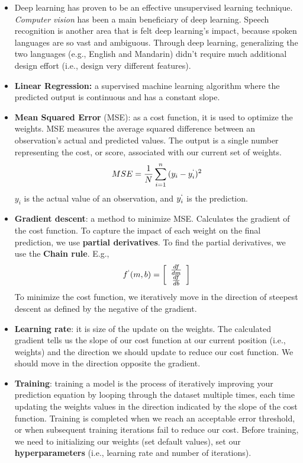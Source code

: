 \documentclass[]{article}
\begin{document}
\begin{itemize}
\begin{itemize}
		\item Deep learning has proven to be an effective unsupervised learning technique. \textit{Computer vision} has been a main beneficiary of deep learning. Speech recognition is another area that is felt deep learning's impact, because spoken languages are so vast and ambiguous. Through deep learning, generalizing the two languages (e.g., English and Mandarin) didn't require much additional design effort (i.e., design very different features).
		\item \textbf{Linear Regression:} a supervised machine learning algorithm where the predicted output is continuous and has a constant slope.
		\item \textbf{Mean Squared Error} (MSE): as a cost function, it is used to optimize the weights. MSE measures the average squared difference between an observation's actual and predicted values. The output is a single number representing the cost, or score, associated with our current set of weights.
		\begin{equation}
		MSE = \frac{1}{N} \sum_{i=1}^{n}{(y_i-y^`_i)^2}
		\end{equation}
		$y_i$ is the actual value of an observation, and $y^`_i$ is the prediction.
		\item \textbf{Gradient descent}: a method to minimize MSE. Calculates the gradient of the cost function. To capture the impact of each weight on the final prediction, we use \textbf{partial derivatives}. To find the partial derivatives, we use the \textbf{Chain rule}. E.g.,
		\begin{equation}
		f^`(m,b)=\left[
		\begin{array}{c}
		\frac{df}{dm} \\
		\frac{df}{db}
		\end{array}
		\right]
		\end{equation}
		To minimize the cost function, we iteratively move in the direction of steepest descent as defined by the negative of the gradient.
		
		\item \textbf{Learning rate}: it is size of the update on the weights. The calculated gradient tells us the slope of our cost function at our current position (i.e., weights) and the direction we should update to reduce our cost function. We should move in the direction opposite the gradient.
		
		\item \textbf{Training}: training a model is the process of iteratively improving your prediction equation by looping through the dataset multiple times, each time updating the weights values in the direction indicated by the slope of the cost function. Training is completed when we reach an acceptable error threshold, or when subsequent training iterations fail to reduce our cost. Before training, we need to initializing our weights (set default values), set our \textbf{hyperparameters} (i.e., learning rate and number of iterations).
		

\end{itemize}
\end{itemize}
\end{document}
